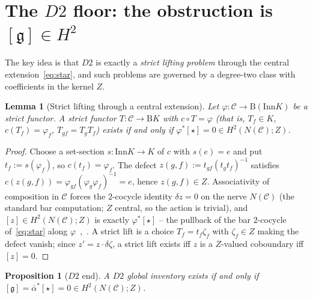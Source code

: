 \documentclass[11pt]{article}
\newtheorem{proposition}[theorem]{Proposition}
\newtheorem{lemma}[theorem]{Lemma}
\theoremstyle{definition}
\newcommand{\C}{\mathcal{C}}
\newcommand{\Inn}{\mathrm{Inn}}
\newcommand{\gerbe}{\mathfrak{g}}
\newcommand{\abar}{\bar{\alpha}}
\newcommand{\B}{\mathrm{B}}
\begin{document}
\section{The $D2$ floor: the obstruction is $[\gerbe]\in H^2$}\label{sec:d2}

The key idea is that $D2$ is exactly a \emph{strict lifting problem} through the central
extension~\eqref{eq:star}, and such problems are governed by a degree-two class with
coefficients in the kernel $Z$.

\begin{lemma}[Strict lifting through a central extension]\label{lem:lift}
Let $\varphi\colon\C\to\B(\Inn K)$ be a strict functor. A strict functor $T\colon\C\to\B K$
with $c\circ T=\varphi$ (that is, $T_f\in K$, $c(T_f)=\varphi_f$, $T_{gf}=T_g T_f$) exists if
and only if $\varphi^{*}[\star]=0\in H^2(N(\C);Z)$.
\end{lemma}

\begin{proof}
Choose a set-section $s\colon\Inn K\to K$ of $c$ with $s(e)=e$ and put $t_f:=s(\varphi_f)$,
so $c(t_f)=\varphi_f$. The defect $z(g,f):=t_{gf}(t_g t_f)^{-1}$ satisfies $c(z(g,f))=
\varphi_{gf}(\varphi_g\varphi_f)^{-1}=e$, hence $z(g,f)\in Z$. Associativity of composition
in $\C$ forces the $2$-cocycle identity $\delta z=0$ on the nerve $N(\C)$ (the standard bar
computation; $Z$ central, so the action is trivial), and $[z]\in H^2(N(\C);Z)$ is exactly
$\varphi^{*}[\star]$ -- the pullback of the bar $2$-cocycle of~\eqref{eq:star} along
$\varphi$~\cite[IV.3]{brown},~\cite{eml}. A strict lift is a choice $T_f=t_f\zeta_f$ with
$\zeta_f\in Z$ making the defect vanish; since $z'=z\cdot\delta\zeta$, a strict lift exists
iff $z$ is a $Z$-valued coboundary iff $[z]=0$.
\end{proof}

\begin{proposition}[$D2$ end]\label{prop:d2}
A $D2$ global inventory exists if and only if $[\gerbe]=\abar^{*}[\star]=0\in H^2(N(\C);Z)$.
\end{proposition}
\end{document}
